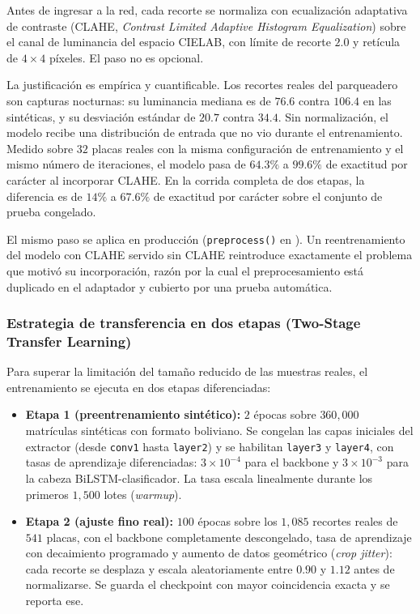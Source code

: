 Antes de ingresar a la red, cada recorte se normaliza con ecualización adaptativa
de contraste (CLAHE, \textit{Contrast Limited Adaptive Histogram Equalization})
sobre el canal de luminancia del espacio CIELAB, con límite de recorte $2{.}0$ y
retícula de $4 \times 4$ píxeles. El paso no es opcional.

La justificación es empírica y cuantificable. Los recortes reales del parqueadero
son capturas nocturnas: su luminancia mediana es de $76{.}6$ contra $106{.}4$ en
las sintéticas, y su desviación estándar de $20{.}7$ contra $34{.}4$. Sin
normalización, el modelo recibe una distribución de entrada que no vio durante el
entrenamiento. Medido sobre $32$ placas reales con la misma configuración de
entrenamiento y el mismo número de iteraciones, el modelo pasa de $64{.}3\%$ a
$99{.}6\%$ de exactitud por carácter al incorporar CLAHE. En la corrida completa
de dos etapas, la diferencia es de $14\%$ a $67{.}6\%$ de exactitud por carácter
sobre el conjunto de prueba congelado.

El mismo paso se aplica en producción
(\texttt{preprocess()} en
).
Un reentrenamiento del modelo con CLAHE servido sin CLAHE reintroduce exactamente
el problema que motivó su incorporación, razón por la cual el preprocesamiento
está duplicado en el adaptador y cubierto por una prueba automática.

\subsubsection{Estrategia de transferencia en dos etapas (Two-Stage Transfer Learning)}

Para superar la limitación del tamaño reducido de las muestras reales, el
entrenamiento se ejecuta en dos etapas diferenciadas:

\begin{itemize}
    \item \textbf{Etapa 1 (preentrenamiento sintético):} $2$ épocas sobre
        $360{,}000$ matrículas sintéticas con formato boliviano. Se congelan las
        capas iniciales del extractor (desde \texttt{conv1} hasta
        \texttt{layer2}) y se habilitan \texttt{layer3} y \texttt{layer4}, con
        tasas de aprendizaje diferenciadas: $3 \times 10^{-4}$ para el backbone
        y $3 \times 10^{-3}$ para la cabeza BiLSTM-clasificador. La tasa escala
        linealmente durante los primeros $1{,}500$ lotes (\textit{warmup}).
    \item \textbf{Etapa 2 (ajuste fino real):} $100$ épocas sobre los $1{,}085$
        recortes reales de $541$ placas, con el backbone completamente
        descongelado, tasa de aprendizaje con decaimiento programado y aumento de
        datos geométrico (\textit{crop jitter}): cada recorte se desplaza y escala
        aleatoriamente entre $0{.}90$ y $1{.}12$ antes de normalizarse. Se guarda
        el checkpoint con mayor coincidencia exacta y se reporta ese.
\end{itemize}

